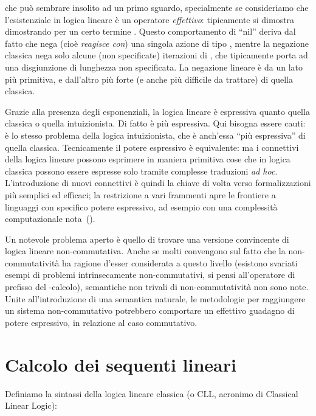\documentclass[12pt,a4paper,openright,twoside]{report}
\begin{document}
che pu\`o sembrare insolito ad un primo sguardo, specialmente se consideriamo che l'esistenziale in logica lineare \`e un operatore \emph{effettivo}: tipicamente si dimostra  dimostrando  per un certo termine . Questo comportamento di ``nil'' deriva dal fatto che  nega (cio\`e \emph{reagisce con}) una singola azione di tipo , mentre la negazione classica nega solo alcune (non specificate) iterazioni di , che tipicamente porta ad una disgiunzione di lunghezza non specificata. La negazione lineare \`e da un lato pi\`u primitiva, e dall'altro pi\`u forte (e anche pi\`u difficile da trattare) di quella classica.


Grazie alla presenza degli esponenziali, la logica lineare \`e espressiva quanto quella classica o quella intuizionista. Di fatto \`e pi\`u espressiva. Qui bisogna essere cauti: \`e lo stesso problema della logica intuizionista, che \`e anch'essa ``pi\`u espressiva'' di quella classica. Tecnicamente il potere espressivo \`e equivalente: ma i connettivi della logica lineare possono esprimere in maniera primitiva cose che in logica classica possono essere espresse solo tramite complesse traduzioni \emph{ad hoc}. L'introduzione di nuovi connettivi \`e quindi la chiave di volta verso formalizzazioni pi\`u semplici ed efficaci; la restrizione a vari frammenti apre le frontiere a linguaggi con specifico potere espressivo, ad esempio con una complessit\`a computazionale nota~(\cite{Gir98, Laf02, DalBai06}).

Un notevole problema aperto \`e quello di trovare una versione convincente di logica lineare non-commutativa. Anche se molti convengono sul fatto che la non-commutativit\`a ha ragione d'esser considerata a questo livello (esistono svariati esempi di problemi intrinsecamente non-commutativi, si pensi all'operatore di prefisso del -calcolo), semantiche non trivali di non-commutativit\`a non sono note. Unite all'introduzione di una semantica naturale, le metodologie per raggiungere un sistema non-commutativo potrebbero comportare un effettivo guadagno di potere espressivo, in relazione al caso commutativo.

\section{Calcolo dei sequenti lineari}

Definiamo la sintassi della logica lineare classica (o \textsf{CLL}, acronimo di Classical Linear Logic):
\end{document}
